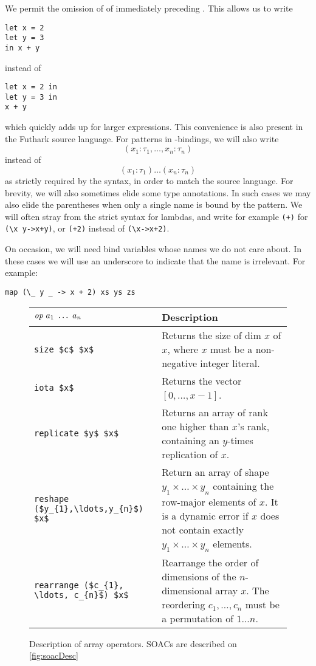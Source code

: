 We permit the omission of of  immediately preceding .
This allows us to write
\begin{lstlisting}
let x = 2
let y = 3
in x + y
\end{lstlisting}
  instead of
\begin{lstlisting}
let x = 2 in
let y = 3 in
x + y
\end{lstlisting}
  which quickly adds up for larger expressions.  This convenience is
  also present in the Futhark source language.  For patterns in
  -bindings, we will also write
\[
  (x_{1}: \tau_{1}, \ldots, x_{n}: \tau_{n})
\]
instead of
\[
  (x_{1}: \tau_{1}) \ldots (x_{n}: \tau_{n})
\]
as strictly required by the syntax, in order to match the source
language.  For brevity, we will also sometimes elide some type
annotations.  In such cases we may also elide the parentheses when
only a single name is bound by the pattern.  We will often stray from
the strict syntax for lambdas, and write for example \lstinline{(+)}
for \lstinline{(\x y->x+y)}, or \lstinline{(+2)} instead of
\lstinline{(\x->x+2)}.

On occasion, we will need bind variables whose names we do not care
about.  In these cases we will use an underscore to indicate that the
name is irrelevant.  For example:
\begin{lstlisting}
map (\_ y _ -> x + 2) xs ys zs
\end{lstlisting}

\begin{figure}
\centering

\begin{tabular}{lp{58mm}}
  $\emph{op}~a_{1}~\ldots~a_{n}$ & Description \\ \hline
  \lstinline[mathescape]!size $c$ $x$! & Returns the size of dim $x$ of $x$, where $x$ must be a non-negative integer literal. \\
  \lstinline[mathescape]!iota $x$! & Returns the vector $[0,\ldots, x-1]$. \\
  \lstinline[mathescape]!replicate $y$ $x$! & Returns an array of rank one higher than $x$'s rank, containing an $y$-times replication of $x$.\\
  \lstinline[mathescape]!reshape ($y_{1},\ldots,y_{n}$) $x$! & Return an array of shape $y_{1}\times\ldots\times y_{n}$ containing the row-major elements of $x$.  It is a dynamic error if $x$ does not contain exactly $y_{1}\times\ldots\times y_{n}$ elements. \\
  \lstinline[mathescape]!rearrange ($c_{1}, \ldots, c_{n}$) $x$! & Rearrange the order of dimensions of the $n$-dimensional array $x$.  The reordering $c_{1}, \ldots, c_{n}$ must be a permutation of $1...n$. \\
\end{tabular}
\caption{Description of array operators.  SOACs are described on \cref{fig:soacDesc}}
\label{fig:arrayDesc}
\end{figure}

